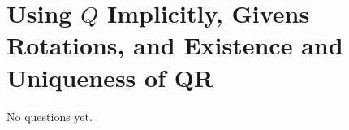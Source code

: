 \chapter{Using $Q$ Implicitly, Givens Rotations, and Existence and Uniqueness of QR}

No questions yet.
